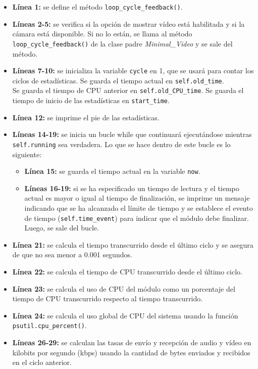 \begin{itemize}
    \item \textbf{Línea 1:} se define el método \texttt{loop\_cycle\_feedback()}.
    \item \textbf{Líneas 2-5:} se verifica si la opción de mostrar vídeo está habilitada y si la cámara está disponible. Si no lo están, se llama al método \texttt{loop\_cycle\_feedback()} de la clase padre \textit{Minimal\_Video} y se sale del método.
    \item \textbf{Líneas 7-10:} se inicializa la variable \texttt{cycle} en 1, que se usará para contar los ciclos de estadísticas. Se guarda el tiempo actual en \texttt{self.old\_time}. \\
    Se guarda el tiempo de CPU anterior en \texttt{self.old\_CPU\_time}. Se guarda el tiempo de inicio de las estadísticas en \texttt{start\_time}.
    \item \textbf{Línea 12:} se imprime el pie de las estadísticas.
    \item \textbf{Líneas 14-19:} se inicia un bucle while que continuará ejecutándose mientras \texttt{self.running} sea verdadera. Lo que se hace dentro de este bucle es lo siguiente:
    \begin{itemize}
        \item \textbf{Línea 15:} se guarda el tiempo actual en la variable \texttt{now}.
        \item \textbf{Líneas 16-19:} si se ha especificado un tiempo de lectura y el tiempo actual es mayor o igual al tiempo de finalización, se imprime un mensaje indicando que se ha alcanzado el límite de tiempo y se establece el evento de tiempo (\texttt{self.time\_event}) para indicar que el módulo debe finalizar. Luego, se sale del bucle.
    \end{itemize}
    \item \textbf{Línea 21:} se calcula el tiempo transcurrido desde el último ciclo y se asegura de que no sea menor a 0.001 segundos.
    \item \textbf{Línea 22:} se calcula el tiempo de CPU transcurrido desde el último ciclo.
    \item \textbf{Línea 23:} se calcula el uso de CPU del módulo como un porcentaje del tiempo de CPU transcurrido respecto al tiempo transcurrido.
    \item \textbf{Línea 24:} se calcula el uso global de CPU del sistema usando la función \texttt{psutil.cpu\_percent()}.
    \item \textbf{Líneas 26-29:} se calculan las tasas de envío y recepción de audio y vídeo en kilobits por segundo (kbps) usando la cantidad de bytes enviados y recibidos en el ciclo anterior.

\end{itemize}
